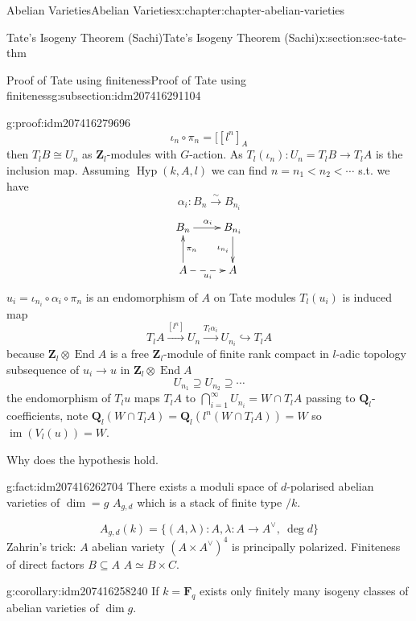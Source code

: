 \documentclass[oneside,10pt,]{book}
\numberwithin{equation}{section}
\newcommand{\lb}{[}
\newcommand{\ZZ}{\mathbf{Z}}
\newcommand{\QQ}{\mathbf{Q}}
\newcommand{\FF}{\mathbf{F}}
\DeclareMathOperator{\End}{End}
\DeclareMathOperator{\im}{im}
\newcommand{\lt}{<}
\begin{document}
\begin{chapterptx}{Abelian Varieties}{}{Abelian Varieties}{}{}{x:chapter:chapter-abelian-varieties}
\begin{sectionptx}{Tate's Isogeny Theorem (Sachi)}{}{Tate's Isogeny Theorem (Sachi)}{}{}{x:section:sec-tate-thm}
\begin{subsectionptx}{Proof of Tate using finiteness}{}{Proof of Tate using finiteness}{}{}{g:subsection:idm207416291104}
\begin{proofptx}{}{g:proof:idm207416279696}
\begin{equation*}
\iota_n \circ \pi_n  =  \lb [l^n]_A
\end{equation*}
then \(T_lB \cong U_n\) as \(\ZZ_l\)-modules with \(G\)-action. As \(T_l(\iota_n) \colon U_n =T_l B  \to T_l A\) is the inclusion map. Assuming \(\operatorname{Hyp}(k,A,l)\) we can find \(n = n_1 \lt n_2 \lt \cdots\) s.t. we have%
\begin{equation*}
\alpha_i \colon B_n \xrightarrow{\sim} B_{n_i}
\end{equation*}
%
\begin{equation*}
\xymatrix{
B_n \ar[r]^{\alpha_i} & B_{n_i} \ar[d]_{\iota_{n_i}}\\
A\ar[u]_{\pi_n} \ar@{-->}_{u_i}[r] & A
}
\end{equation*}
\(u_i = \iota_{n_i} \circ \alpha_i \circ \pi_n\) is an endomorphism of \(A\) on Tate modules \(T_l(u_i)\) is induced map%
\begin{equation*}
T_l A \xrightarrow{[l^n]} U_n \xrightarrow{T_l\alpha_i} U_{n_i} \hookrightarrow T_l A
\end{equation*}
because \(\ZZ_l \otimes \End A\) is a free \(\ZZ_l\)-module of finite rank compact in \(l\)-adic topology subsequence of \(u_i \to u\) in \(\ZZ_l \otimes \End A\)%
\begin{equation*}
U_{n_1} \supseteq U_{n_2} \supseteq \cdots
\end{equation*}
the endomorphism of \(T_l u\) maps \(T_l A\) to \(\bigcap_{i=1}^\infty U_{n_i} = W\cap T_l A\) passing to \(\QQ_l\)-coefficients, note \(\QQ_l(W\cap T_l A) = \QQ_l(l^n(W\cap T_l A)) = W\) so \(\im(V_l(u)) =W\).%
\end{proofptx}
Why does the hypothesis hold.%
\begin{fact}{}{}{g:fact:idm207416262704}%
There exists a moduli space of \(d\)-polarised abelian varieties of \(\dim = g\) \(A_{g,d}\) which is a stack of finite type \(/k\).%
\end{fact}
%
\begin{equation*}
A_{g,d}( k) = \{(A,\lambda) : A , \lambda \colon A \to A^\vee,\ \deg d \}
\end{equation*}
Zahrin's trick: \(A\) abelian variety \((A\times A^\vee)^4\) is principally polarized. Finiteness of direct factors \(B\subseteq A\) \(A\simeq B\times C\).%
\begin{corollary}{}{}{g:corollary:idm207416258240}%
If \(k = \FF_q\) exists only finitely many isogeny classes of abelian varieties of \(\dim g\).%
\end{corollary}

\end{subsectionptx}
\end{sectionptx}
\end{chapterptx}
\end{document}
